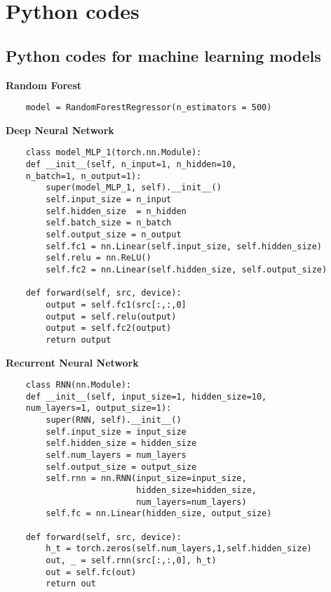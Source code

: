 \chapter{Python codes}
\section{Python codes for machine learning models}
\textbf{Random Forest}
\begin{lstlisting}    
    model = RandomForestRegressor(n_estimators = 500)
    \end{lstlisting}

\textbf{Deep Neural Network}
\begin{lstlisting}
    class model_MLP_1(torch.nn.Module):
    def __init__(self, n_input=1, n_hidden=10, 
    n_batch=1, n_output=1):
        super(model_MLP_1, self).__init__()
        self.input_size = n_input
        self.hidden_size  = n_hidden
        self.batch_size = n_batch
        self.output_size = n_output
        self.fc1 = nn.Linear(self.input_size, self.hidden_size)
        self.relu = nn.ReLU()
        self.fc2 = nn.Linear(self.hidden_size, self.output_size)
        
    def forward(self, src, device):
        output = self.fc1(src[:,:,0]
        output = self.relu(output)
        output = self.fc2(output)
        return output  
    \end{lstlisting}

\textbf{Recurrent Neural Network}
\begin{lstlisting}
    class RNN(nn.Module):
    def __init__(self, input_size=1, hidden_size=10, 
    num_layers=1, output_size=1):
        super(RNN, self).__init__()
        self.input_size = input_size
        self.hidden_size = hidden_size
        self.num_layers = num_layers
        self.output_size = output_size
        self.rnn = nn.RNN(input_size=input_size,
                          hidden_size=hidden_size,
                          num_layers=num_layers)
        self.fc = nn.Linear(hidden_size, output_size)

    def forward(self, src, device):
        h_t = torch.zeros(self.num_layers,1,self.hidden_size)
        out, _ = self.rnn(src[:,:,0], h_t)
        out = self.fc(out)
        return out   

    \end{lstlisting}

